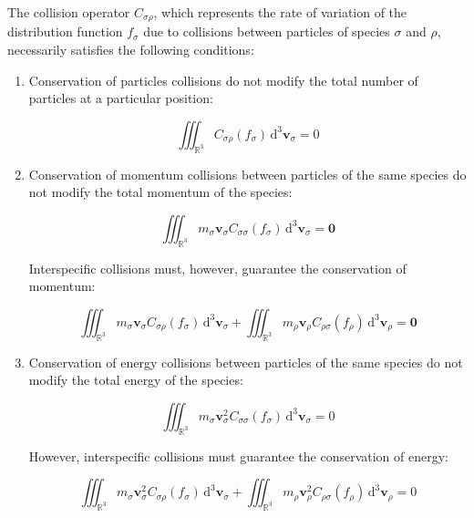 The collision operator $C_{\sigma\rho}$, which represents the rate of variation of the distribution function $f_\sigma$ due to collisions between particles of species $\sigma$ and $\rho$, necessarily satisfies the following conditions:

\begin{enumerate}
    \item Conservation of particles\,\textbf{\textendash}\,collisions do not modify the total number of particles at a particular position:

    \begin{equation}
        \iiint_{\mathbb{R}^3}C_{\sigma\rho}(f_\sigma)\,\mathrm{d}^3\mathbf{v}_\sigma=0
    \end{equation}

    \item Conservation of momentum\,\textbf{\textendash}\,collisions between particles of the same species do not modify the total momentum of the species:

    \begin{equation}
        \iiint_{\mathbb{R}^3}m_\sigma\mathbf{v}_\sigma C_{\sigma\sigma}(f_\sigma)\,\mathrm{d}^3\mathbf{v}_\sigma=\mathbf{0}
    \end{equation}

    Interspecific collisions must, however, guarantee the conservation of momentum:

    \begin{equation}
        \iiint_{\mathbb{R}^3}m_\sigma\mathbf{v}_\sigma C_{\sigma\rho}(f_\sigma)\,\mathrm{d}^3\mathbf{v}_\sigma+\iiint_{\mathbb{R}^3}m_\rho\mathbf{v}_\rho C_{\rho\sigma}(f_\rho)\,\mathrm{d}^3\mathbf{v}_\rho=\mathbf{0}
    \end{equation}

    \item Conservation of energy\,\textbf{\textendash}\,collisions between particles of the same species do not modify the total energy of the species:

    \begin{equation}
        \iiint_{\mathbb{R}^3}m_\sigma\mathbf{v}_\sigma^2C_{\sigma\sigma}(f_\sigma)\,\mathrm{d}^3\mathbf{v}_\sigma=0
    \end{equation}

    However, interspecific collisions must guarantee the conservation of energy:

    \begin{equation}
        \iiint_{\mathbb{R}^3}m_\sigma\mathbf{v}_\sigma^2C_{\sigma\rho}(f_\sigma)\,\mathrm{d}^3\mathbf{v}_\sigma+\iiint_{\mathbb{R}^3}m_\rho\mathbf{v}_\rho^2C_{\rho\sigma}(f_\rho)\,\mathrm{d}^3\mathbf{v}_\rho=0
    \end{equation}
\end{enumerate}


